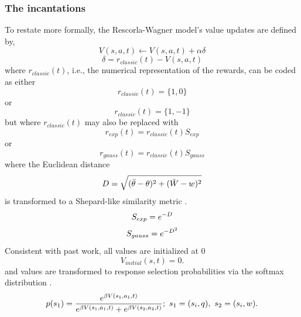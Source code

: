 \documentclass[doc,12pt]{apa}        %
\begin{document}
\subsubsection{The incantations}
\label{subsub:incantations}
To restate more formally, the Rescorla-Wagner model's value updates are defined by,
\begin{equation} \label{eq:V} V(s,a,t) \leftarrow V(s,a,t) + \alpha\delta \end{equation} 
\begin{equation} \label{eq:rpe} \delta = r_{classic}(t) - V(s,a,t) \end{equation}
where $r_{classic}(t)$, i.e., the numerical representation of the rewards, can be coded as either
\begin{equation}
	\label{eq:r1}
	r_{classic}(t) = \{1,0\}
\end{equation}
or 
\begin{equation}
	\label{eq:r2}
	r_{classic}(t) = \{1,-1\}
\end{equation}
but where $r_{classic}(t)$ may also be replaced with
\begin{equation}
	\label{eq:re}
    r_{exp}(t) = r_{classic}(t)S_{exp}
\end{equation}
or
\begin{equation}
	\label{eq:rg}
    r_{gauss}(t) = r_{classic}(t)S_{gauss}
\end{equation}
where the Euclidean distance
\begin{equation}
	\label{eq:D}\\
    D = \sqrt{(\bar{\theta} - \theta)^2 + (\bar{W}-w)^2}
\end{equation}
is transformed to a Shepard-like similarity metric \cite{Shepard:1987p9102}.
\begin{equation}
	\label{eq:Sexp}\\
    S_{exp} = e^{-D}
\end{equation}
\begin{equation}
	\label{eq:Sgauss}\\
    S_{gauss} = e^{-D^2}
\end{equation}
Consistent with past work, all values are initialized at 0 \cite{Beierholm:2011p8141,BischoffGrethe:2009p4570,Gershman:2009p7207}
\begin{equation} \label{eq:V0} V_{initial}(s,t) = 0. \end{equation}
and values are transformed to response selection probabilities via the softmax distribution \cite{Sutton:1998p9247,ODoherty:2003p6329}.
\begin{equation}
	\label{eq:softmax}
	p(s_1) = {e^{\beta V(s_1,a_1,t)}\over{e^{\beta V(s_1,a_1,t)} + e^{\beta V(s_2,a_2,t)}}};\ s_1 = (s_{i},q), \ s_2 = (s_{i}, w).
\end{equation}
\end{document}
